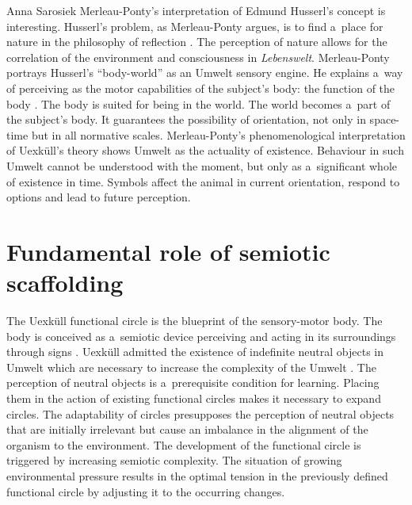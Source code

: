 \begin{artengenv}{Anna Sarosiek}
Merleau-Ponty’s interpretation of Edmund Husserl’s concept is interesting. Husserl’s problem, as Merleau-Ponty argues, is to find a~place for nature in the philosophy of reflection
\parencite[][p.72]{merleau-ponty_nature_2003}. %
 The perception of nature allows for the correlation of the environment and consciousness in \textit{Lebenswelt}. Merleau-Ponty portrays Husserl’s ``body-world'' as an Umwelt sensory engine. He explains a~way of perceiving as the motor capabilities of the subject’s body: the function of the body 
\parencite[][p.74]{merleau-ponty_nature_2003}. %
 The body is suited for being in the world. The world becomes a~part of the subject’s body. It guarantees the possibility of orientation, not only in space-time but in all normative scales. Merleau-Ponty’s phenomenological interpretation of Uexküll’s theory shows Umwelt as the actuality of existence. Behaviour in such Umwelt cannot be understood with the moment, but only as a~significant whole of existence in time. Symbols affect the animal in current orientation, respond to options and lead to future perception.

\section*{Fundamental role of semiotic scaffolding}
The Uexküll functional circle is the blueprint of the sensory-motor body. The body is conceived as a~semiotic device perceiving and acting in its surroundings through signs
\parencite[][p.261]{heidegger_grundbegriffe_1992}. %
 Uexküll admitted the existence of indefinite neutral objects in Umwelt which are necessary to increase the complexity of the Umwelt 
\parencite[][pp.92–93]{uexkull_streifzuge_1934}. %
 The perception of neutral objects is a~prerequisite condition for learning. Placing them in the action of existing functional circles makes it necessary to expand circles. The adaptability of circles presupposes the perception of neutral objects that are initially irrelevant but cause an imbalance in the alignment of the organism to the environment. The development of the functional circle is triggered by increasing semiotic complexity. The situation of growing environmental pressure results in the optimal tension in the previously defined functional circle by adjusting it to the occurring changes.


\end{artengenv}
